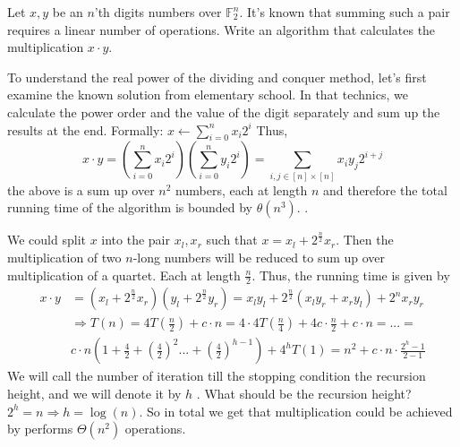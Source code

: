 \begin{example}
Let \(x,y\) be an \(n\)'th digits numbers over \( \mathbb{F}^{n}_{2} \). It's known that summing such a pair requires a linear number of operations. Write an algorithm that calculates the multiplication \(x\cdot y\). 
\end{example}
\begin{example}
To understand the real power of the dividing and conquer method, let's first examine the known solution from elementary school.  In that technics, we calculate the power order and the value of the digit separately and sum up the results at the end. Formally: \(x \leftarrow \sum_{i=0}^{n}{x_{i}2^{i}}\) Thus, \[ x\cdot y =\left( \sum_{i=0}^{n}{x_{i}2^{i}} \right) \left( \sum_{i=0}^{n}{y_{i}2^{i}} \right) =  \sum_{i,j \in [n]\times[n] }{ x_{i}y_{j}2^{i+j} }\] the above is a sum up over \(n^2\) numbers, each at length \(n\) and therefore the total running time of the algorithm is bounded by \( \theta(n^3) \). .
\end{example}
\begin{example} We could split \(x\) into the pair \(x_{l}, x_{r}\) such that \(x = x_{l} + 2^{\frac{n}{2}}x_{r} \). Then the multiplication of two \(n\)-long numbers will be reduced to sum up over multiplication of a quartet. Each at length \(\frac{n}{2}\). Thus, the running time is given by \begin{equation*}
    \begin{split}
 x\cdot y & = \left(x_{l} + 2^{\frac{n}{2}}x_{r}\right)\left(y_{l} + 2^{\frac{n}{2}}y_{r}\right) = x_{l}y_{l} + 2^{\frac{n}{2}} \left( x_{l}y_{r} + x_{r}y_{l} \right) + 2^{n}x_{r}y_{r} \\ &  \Rightarrow T\left(n\right)  =4T\left(\frac{n}{2}\right)+c\cdot n=4\cdot4T\left(\frac{n}{4}\right)+4c\cdot\frac{n}{2}+c\cdot n = ... = \\ & c\cdot n\left(1+\frac{4}{2}+\left(\frac{4}{2}\right)^{2}...+\left(\frac{4}{2}\right)^{h-1}\right) + 4^{h}T(1) = n^{2} + c\cdot n\cdot\frac{2^{h}-1}{2-1}
    \end{split}
\end{equation*}
We will call the number of iteration till the stopping condition the recursion height, and we will denote it by \(h\) . What should be the recursion height? \( 2^{h} = n \Rightarrow h =\log\left(n\right) \). So in total we get that multiplication could be achieved by performs \( \Theta\left(n^2\right)\) operations. 
\end{example}
